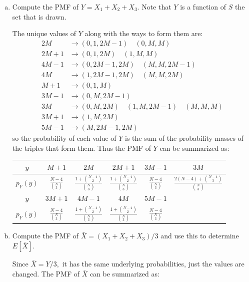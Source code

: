 \documentclass{article}
\begin{document}
\begin{enumerate}
\begin{enumerate}[(a)]
			\item Compute the PMF of $Y=X_1+X_2+X_3.$ Note that $Y$ is a function of $S$ the set that is drawn.
				\begin{soln}
					The unique values of $Y$ along with the ways to form them are:
					\begin{align*}
						2M &\to (0, 1, 2M-1)\quad(0, M, M) \\
						2M+1 &\to (0, 1, 2M)\quad(1, M, M) \\
						4M-1 &\to (0, 2M-1, 2M)\quad(M, M, 2M-1) \\
						4M &\to (1, 2M-1, 2M)\quad(M, M, 2M) \\
						M+1 &\to (0, 1, M) \\
						3M-1 &\to (0, M, 2M-1) \\
						3M &\to (0, M, 2M)\quad(1, M, 2M-1)\quad(M, M, M) \\
						3M+1 &\to (1, M, 2M) \\
						5M-1 &\to (M, 2M-1, 2M)
					\end{align*}
					so the probability of each value of $Y$ is the sum of the probability masses of the triples that form them. Thus the PMF of $Y$ can be summarized as:

					\begin{center}
						\begin{tabular}{c||c|c|c|c|c}
							$y$ & $M+1$ & $2M$ & $2M+1$ & $3M-1$ & $3M$ \\
							\hline
							$p_Y(y)$ & $\displaystyle\frac{N-4}{\binom{N}{3}}$ & $\displaystyle\frac{1+\binom{N-4}{2}}{\binom{N}{3}}$ & $\displaystyle\frac{1+\binom{N-4}{2}}{\binom{N}{3}}$ & $\displaystyle\frac{N-4}{\binom{N}{3}}$ & $\displaystyle\frac{2(N-4)+\binom{N-4}{3}}{\binom{N}{3}}$ \\
							\hline
							$y$ & $3M+1$ & $4M-1$ & $4M$ & $5M-1$ & \\
							\hline
							 $p_Y(y)$ & $\displaystyle\frac{N-4}{\binom{N}{3}}$ & $\displaystyle\frac{1+\binom{N-4}{2}}{\binom{N}{3}}$ & $\displaystyle\frac{1+\binom{N-4}{2}}{\binom{N}{3}}$ & $\displaystyle\frac{N-4}{\binom{N}{3}}$ & 
						\end{tabular}
					\end{center}

				\end{soln}

			\item Compute the PMF of $\bar{X}=(X_1+X_2+X_3)/3$ and use this to determine $E[\bar{X}].$
				\begin{soln}
					Since $\bar{X}=Y/3,$ it has the same underlying probabilities, just the values are changed. The PMF of $\bar{X}$ can be summarized as:


\end{soln}
\end{enumerate}
\end{enumerate}
\end{document}
